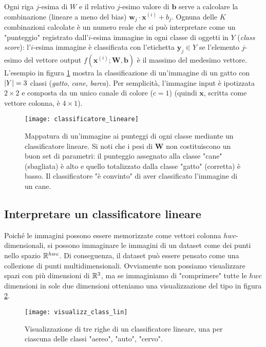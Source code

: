Ogni riga $j$-esima di $W$ e il relativo $j$-esimo valore di $\mathbf{b}$ serve a calcolare la combinazione (lineare a meno del bias) $\mathbf{w}_j\cdot \mathbf{x}^{(i)}+b_j$. Ognuna delle $K$ combinazioni calcolate è un numero reale che si può interpretare come un "punteggio" registrato dall'$i$-esima immagine in ogni classe di oggetti in $Y$ (\textit{class score}): l'$i$-esima immagine è classificata con l'etichetta $\mathbf{y}_j\in Y$ se l'elemento $j$-esimo del vettore output $f(\mathbf{x}^{(i)};\mathbf{W},\mathbf{b})$ è il massimo del medesimo vettore.\\

L'esempio in figura \ref{class_lin} mostra la classificazione di un'immagine di un gatto con $\left|Y\right|=3$ classi (\textit{gatto}, \textit{cane}, \textit{barca}). Per semplicità, l'immagine input è ipotizzata $2\times 2$ e composta da un unico canale di colore ($c=1$) (quindi $\mathbf{x}$, scritta come vettore colonna, è $4\times 1$).

\begin{figure}[h]
\centering
\texttt{[image: classificatore\_lineare]}
\caption{Mappatura di un'immagine ai punteggi di ogni classe mediante un classificatore lineare. Si noti che i pesi di $\mathbf{W}$ non costituiscono un buon set di parametri: il punteggio assegnato alla classe "cane" (sbagliata) è alto e quello totalizzato dalla classe "gatto" (corretta) è basso. Il classificatore "è convinto" di aver classificato l'immagine di un cane.}
\label{class_lin}
\end{figure}

\subsection*{Interpretare un classificatore lineare}

Poiché le immagini possono essere memorizzate come vettori colonna $hwc$-dimensionali, si possono immaginare le immagini di un dataset come dei punti nello spazio $\mathbb{R}^{hwc}$. Di conseguenza, il dataset può essere pensato come una collezione di punti multidimensionali. Ovviamente non possiamo visualizzare spazi con più dimensioni di $\mathbb{R}^{3}$, ma se immaginiamo di "comprimere" tutte le $hwc$ dimensioni in sole due dimensioni otteniamo una visualizzazione del tipo in figura \ref{visual_class_lin}.

\begin{figure}[h]
\centering
\texttt{[image: visualizz\_class\_lin]}
\caption{Visualizzazione di tre righe di un classificatore lineare, una per ciascuna delle classi "aereo", "auto", "cervo".}
\label{visual_class_lin}
\end{figure}

